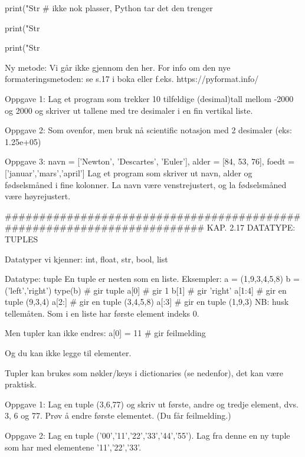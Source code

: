{print("Str %
                                  # ikke nok plasser, Python tar det den trenger

print("Str %

print("Str %




Ny metode:
Vi går ikke gjennom den her. 
For info om den nye formateringsmetoden: se s.17 i boka eller f.eks. https://pyformat.info/



Oppgave 1: Lag et program som trekker 10 tilfeldige (desimal)tall mellom 
-2000 og 2000 og skriver ut tallene med tre desimaler i en fin vertikal liste.

Oppgave 2: Som ovenfor, men bruk nå scientific notasjon med 2 desimaler (eks: 1.25e+05)

Oppgave 3: navn = ['Newton', 'Descartes', 'Euler'], alder = [84, 53, 76], 
foedt = ['januar','mars','april']
Lag et program som skriver ut navn, alder og fødselsmåned i fine kolonner.
La navn være venstrejustert, og la fødselsmåned være høyrejustert.

######################################################################## 
KAP. 2.17  DATATYPE: TUPLES 

Datatyper vi kjenner: int, float, str, bool, list 

Datatype: tuple
En tuple er nesten som en liste.
Eksempler: 
a = (1,9,3,4,5,8)
b = ('left','right')
type(b)    # gir tuple
a[0]       # gir 1 
b[1]       # gir 'right'
a[1:4]     # gir en tuple (9,3,4)
a[2:]      # gir en tuple (3,4,5,8)
a[:3]      # gir en tuple (1,9,3)
NB: husk tellemåten. Som i en liste har første element indeks 0. 

Men tupler kan ikke endres:
a[0] = 11  # gir feilmelding

Og du kan ikke legge til elementer. 

Tupler kan brukes som nøkler/keys i dictionaries (se nedenfor), det kan være praktisk. 



Oppgave 1: Lag en tuple (3,6,77) og skriv ut første, andre og tredje element, dvs. 3, 6 og 77.
Prøv å endre første elementet. (Du får feilmelding.) 


Oppgave 2: Lag en tuple ('00','11','22','33','44','55'). 
Lag fra denne en ny tuple som har med elementene '11','22','33'. 


}
